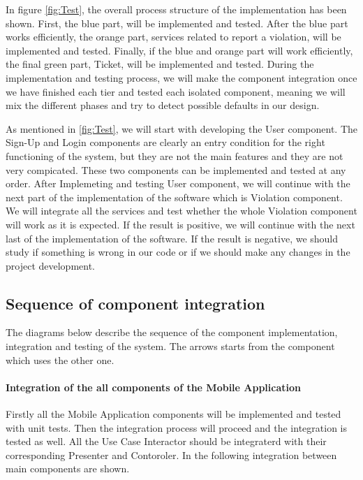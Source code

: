 In ﬁgure \ref{fig:Test}, the overall process structure of the implementation has been shown. First, the blue part, will be implemented and tested. After the blue part works eﬃciently, the orange part, services related to report a violation, will be implemented and tested. Finally, if the blue and orange part will work eﬃciently, the ﬁnal green part, Ticket, will be implemented and tested. During the implementation and testing process, we will make the component integration once we have ﬁnished each tier and tested each isolated component, meaning we will mix the different phases and try to detect possible defaults in our design.

As mentioned in \ref{fig:Test}, we will start with developing the User component. The Sign-Up and Login components are clearly an entry condition for the right functioning of the system, but they are not the main features and they are not very compicated. These two components can be implemented and tested at any order. After Implemeting and testing User component, we will continue with the next part of the implementation of the software which is Violation component. We will integrate all the services and test whether the whole Violation component will work as it is expected. If the result is positive, we will continue with the next last of the implementation of the software. If the result is negative, we should study if something is wrong in our code or if we should make any changes in the project development.

\subsection{Sequence of component integration}
The diagrams below describe the sequence of the component implementation, integration and testing of the system. The arrows starts from the component which uses the other one.

\paragraph{Integration of the all components of the Mobile Application}
Firstly all the Mobile Application components will be implemented and tested with unit tests. Then the integration process will proceed and the integration is tested as well. All the Use Case Interactor should be integraterd with their corresponding Presenter and Contoroler. In the following integration between main components are shown.

